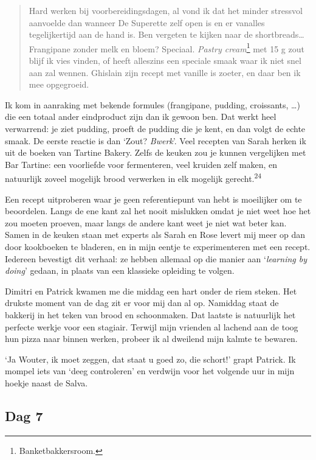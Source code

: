 \documentclass[
  11pt,
  dutch,
]{memoir}
\begin{document}
\begin{quote}
Hard werken bij voorbereidingsdagen, al vond ik dat het minder stressvol
aanvoelde dan wanneer De Superette zelf open is en er vanalles
tegelijkertijd aan de hand is. Ben vergeten te kijken naar de
shortbreads\ldots{} Frangipane zonder melk en bloem? Speciaal.
\emph{Pastry cream}\footnote{Banketbakkersroom.} met 15 g zout blijf ik
vies vinden, of heeft alleszins een speciale smaak waar ik niet snel aan
zal wennen. Ghislain zijn recept met vanille is zoeter, en daar ben ik
mee opgegroeid.
\end{quote}

Ik kom in aanraking met bekende formules (frangipane, pudding,
croissants, \ldots) die een totaal ander eindproduct zijn dan ik gewoon
ben. Dat werkt heel verwarrend: je ziet pudding, proeft de pudding die
je kent, en dan volgt de echte smaak. De eerste reactie is dan `Zout?
\emph{Bwerk}'. Veel recepten van Sarah herken ik uit de boeken van
Tartine Bakery. Zelfs de keuken zou je kunnen vergelijken met Bar
Tartine: een voorliefde voor fermenteren, veel kruiden zelf maken, en
natuurlijk zoveel mogelijk brood verwerken in elk mogelijk
gerecht.\textsuperscript{24}

Een recept uitproberen waar je geen referentiepunt van hebt is
moeilijker om te beoordelen. Langs de ene kant zal het nooit mislukken
omdat je niet weet hoe het zou moeten proeven, maar langs de andere kant
weet je niet wat beter kan. Samen in de keuken staan met experts als
Sarah en Rose levert mij meer op dan door kookboeken te bladeren, en in
mijn eentje te experimenteren met een recept. Iedereen bevestigt dit
verhaal: ze hebben allemaal op die manier aan `\emph{learning by doing}'
gedaan, in plaats van een klassieke opleiding te volgen.

Dimitri en Patrick kwamen me die middag een hart onder de riem steken.
Het drukste moment van de dag zit er voor mij dan al op. Namiddag staat
de bakkerij in het teken van brood en schoonmaken. Dat laatste is
natuurlijk het perfecte werkje voor een stagiair. Terwijl mijn vrienden
al lachend aan de toog hun pizza naar binnen werken, probeer ik al
dweilend mijn kalmte te bewaren.

`Ja Wouter, ik moet zeggen, dat staat u goed zo, die schort!' grapt
Patrick. Ik mompel iets van `deeg controleren' en verdwijn voor het
volgende uur in mijn hoekje naast de Salva.

\hypertarget{dag-7}{%
\subsection{Dag 7}\label{dag-7}}
\end{document}
